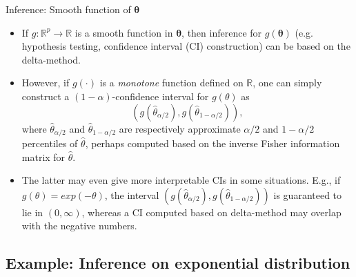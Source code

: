 \documentclass{beamer}
\newcommand{\boldtheta}{{\boldsymbol \theta}}
\newcommand{\currentsubsection}{}
\let\oldsubsection\subsection
\renewcommand{\subsection}[1]{\oldsubsection{#1}\renewcommand{\currentsubsection}{#1}}
\begin{document}
\begin{frame} {Inference: Smooth function of $\boldtheta$}

\begin{itemize}

\item If $g : \mathbb{R}^p \rightarrow \mathbb{R}$ is a smooth function in $\boldtheta$, then inference for $g(\boldtheta)$ (e.g. hypothesis testing, confidence interval (CI) construction) can be based on the delta-method.


\item However, if $g(\cdot)$ is a \emph{monotone} function defined on $\mathbb{R}$, one can simply construct a $(1 - \alpha)$-confidence interval for $g(\theta)$ as 
\[
(g(\hat{\theta}_{\alpha/2}),  g(\hat{\theta}_{1 - \alpha/2})),
\]
where $\hat{\theta}_{\alpha/2}$ and $\hat{\theta}_{1 - \alpha/2}$ are respectively approximate $\alpha/2$ and $1 - \alpha/2$ percentiles of $\hat{\theta}$, perhaps computed based on the  inverse Fisher information matrix for $\hat{\theta}$.

\item The latter may even give more interpretable CIs in some situations. E.g., if $g(\theta) = exp( - \theta)$, the interval  $(
g(\hat{\theta}_{\alpha/2}), g(\hat{\theta}_{1 - \alpha/2}))$  is guaranteed to lie in $(0, \infty)$, whereas a CI computed based on delta-method may overlap with the negative numbers.



\end{itemize}


\end{frame}


\subsection{Example: Inference  on exponential distribution}
\end{document}
